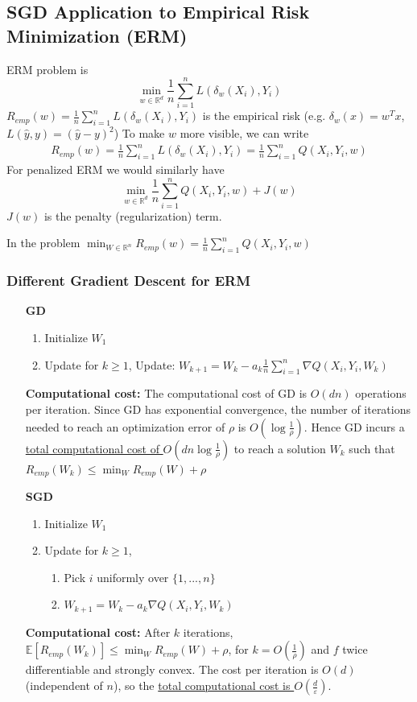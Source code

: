 \documentclass[11pt,a4paper]{article}
\begin{document}
\subsection{SGD Application to Empirical Risk Minimization (ERM)}
ERM problem is
$$\min_{w\in \mathbb{R}^d}\frac{1}{n}\sum_{i=1}^nL(\delta_w(X_i),Y_i)$$
$R_{emp}(w)=\frac{1}{n}\sum_{i=1}^nL(\delta_w(X_i),Y_i)$ is the empirical risk (e.g. $\delta_w(x)=w^Tx$, $L(\hat{y},y)=(\hat{y}-y)^2$)
To make $w$ more visible, we can write
\begin{equation}
    \begin{aligned}
        R_{emp}(w)=\frac{1}{n}\sum_{i=1}^nL(\delta_w(X_i),Y_i)
        =\frac{1}{n}\sum_{i=1}^nQ(X_i,Y_i,w)
    \end{aligned}
    \nonumber
\end{equation}
For penalized ERM we would similarly have $$\min_{w\in \mathbb{R}^d}\frac{1}{n}\sum_{i=1}^nQ(X_i,Y_i,w)+J(w)$$ $J(w)$ is the penalty (regularization) term.

In the problem $\min_{W\in \mathbb{R}^n}R_{emp}(w)=\frac{1}{n}\sum_{i=1}^nQ(X_i,Y_i,w)$

\subsubsection{Different Gradient Descent for ERM}
\begin{enumerate}
    \item[\textbf{GD}]
    \begin{enumerate}[$\bullet$]
        \item Initialize $W_1$
        \item Update for $k\geq 1$,
        Update: $W_{k+1}=W_k-a_k \frac{1}{n}\sum_{i=1}^n\nabla Q(X_i,Y_i,W_k)$
    \end{enumerate}
    \textbf{Computational cost:} The computational cost of GD is $O(dn)$ operations per iteration. Since GD has exponential convergence, the number of iterations needed to reach an optimization error of $\rho$ is $O(\log\frac{1}{\rho})$. Hence GD incurs a \underline{total computational cost of $O(dn\log\frac{1}{\rho})$} to reach a solution $W_k$ such that $R_{emp}(W_k)\leq \min_WR_{emp}(W)+\rho$
    \item[\textbf{SGD}]
    \begin{enumerate}[$\bullet$]
        \item Initialize $W_1$
        \item Update for $k\geq 1$,
        \begin{enumerate}[{Step} 1:]
            \item Pick $i$ uniformly over $\{1,...,n\}$
            \item $W_{k+1}=W_k-a_k \nabla Q(X_i,Y_i,W_k)$
        \end{enumerate}
    \end{enumerate}
    \textbf{Computational cost:} After $k$ iterations, $\mathbb{E}[R_{emp}(W_k)]\leq \min_W R_{emp}(W)+\rho$, for $k=O(\frac{1}{\rho})$ and $f$ twice differentiable and strongly convex. The cost per iteration is $O(d)$ (independent of $n$), so the \underline{total computational cost is $O(\frac{d}{\varepsilon})$}.
\end{enumerate}
\end{document}
